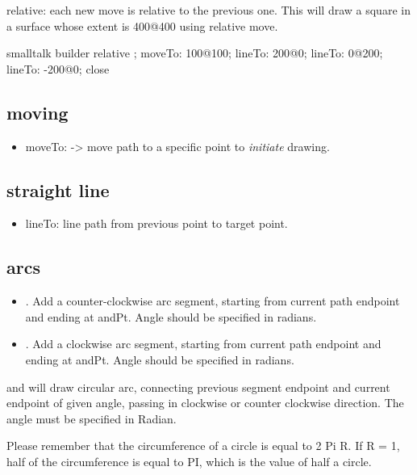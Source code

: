 \documentclass[10pt,twoside,english]{_support/latex/sbabook/sbabook}
\begin{document}
relative: each new move is relative to the previous one.
This will draw a square in a surface whose extent is 400@400 using relative move.
\begin{displaycode}{smalltalk}
 builder relative ;
  moveTo: 100@100;
  lineTo: 200@0;
  lineTo: 0@200;
  lineTo: -200@0;
  close
\end{displaycode}

\subsection{moving}
\begin{itemize}
    \item moveTo: -\textgreater{} move path to a specific point to \textit{initiate} drawing.
\end{itemize}

\subsection{straight line}
\begin{itemize}
    \item lineTo: line path from previous point to target point.
\end{itemize}

\subsection{arcs}
\begin{itemize}
    \item {}. Add a counter-clockwise arc segment, starting from current path endpoint and ending at andPt. Angle should be specified in radians.
    \item {}. Add a clockwise arc segment, starting from current path endpoint and ending at andPt. Angle should be specified in radians.
\end{itemize}

 and  will draw circular arc, connecting previous segment endpoint and current endpoint of given angle, passing in
clockwise or counter clockwise direction. The angle must be specified in Radian.

Please remember that the circumference of a circle is equal to 2 Pi  R.
If R = 1, half of the circumference is equal to PI, which is the value of half a circle.
\end{document}
